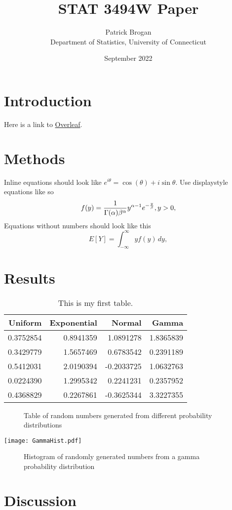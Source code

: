 \documentclass[12pt, letterpaper, twoside]{article}\usepackage[]{graphicx}\usepackage[]{xcolor}
\title{STAT 3494W Paper}
\author{Patrick Brogan\\[1ex]
  Department of Statistics, University of Connecticut\\}
\date{September 2022}
\begin{document}
\maketitle

\begin{abstract}
\lipsum[1-2]
\end{abstract}

\section*{Introduction}
Here is a link to \href{http://www.overleaf.com}{Overleaf}. \lipsum[2-4]
\section*{Methods}
\lipsum[4-6] Inline equations should look like \(e^{i\theta} = \cos(\theta) + i\sin\theta\). Use displaystyle equations like so \begin{equation}
  f(y) = \frac{1}{\Gamma(\alpha)\beta^\alpha}\*y^{\alpha-1}e^{-\frac{y}{\beta}}, y > 0,
\end{equation}
Equations without numbers should look like this
\[
  E[Y] = \int_{-\infty}^{\infty} yf(y) \,dy,
\]


\section*{Results}
\lipsum[6-8]

\begin{table}[tbp]
  \caption{This is my first table.}
  \label{tab:rv}
\centering
\begin{tabular}{rrrr}
 \toprule
 Uniform & Exponential & Normal & Gamma \\
 \midrule
 0.3752854 & 0.8941359 & 1.0891278 & 1.8365839 \\
 0.3429779 & 1.5657469 & 0.6783542 & 0.2391189 \\
 0.5412031 & 2.0190394 & -0.2033725 & 1.0632763 \\
 0.0224390 & 1.2995342 & 0.2241231 & 0.2357952 \\
 0.4368829 & 0.2267861 & -0.3625344 & 3.3227355 \\
 \bottomrule
\end{tabular}
\end{table}

\begin{figure}[h]
  \centering
  \caption{Table of random numbers generated from different probability distributions}
  \label{fig:Random Variable Table}
\end{figure}

\texttt{[image: GammaHist.pdf]}

\begin{figure}[h]
  \centering
  \caption{Histogram of randomly generated numbers from a gamma probability distribution}
  \label{fig:Random Gamma Histogram}
\end{figure}

\section*{Discussion}
\lipsum[8-10]
\end{document}
